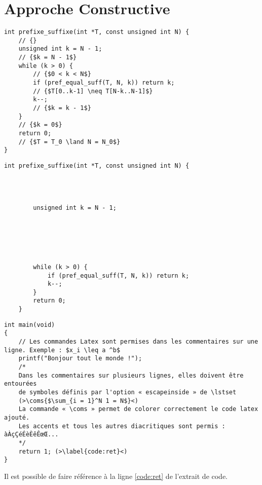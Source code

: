 \section{Approche Constructive}

\begin{lstlisting}[caption={SP1}]
int prefixe_suffixe(int *T, const unsigned int N) {
    // {}
    unsigned int k = N - 1;
    // {$k = N - 1$}
    while (k > 0) {
        // {$0 < k < N$}
        if (pref_equal_suff(T, N, k)) return k;
        // {$T[0..k-1] \neq T[N-k..N-1]$}
        k--;
        // {$k = k - 1$}
    }
    // {$k = 0$}
    return 0;
    // {$T = T_0 \land N = N_0$}
}
\end{lstlisting}




\begin{lstlisting}[caption={SP2}]
    int prefixe_suffixe(int *T, const unsigned int N) {




        unsigned int k = N - 1;






        while (k > 0) {
            if (pref_equal_suff(T, N, k)) return k;
            k--;
        }
        return 0;
    }
\end{lstlisting}


\begin{lstlisting}[caption={AAAA}]
int main(void)
{
    // Les commandes Latex sont permises dans les commentaires sur une ligne. Exemple : $x_i \leq a ^b$
    printf("Bonjour tout le monde !");
    /*
    Dans les commentaires sur plusieurs lignes, elles doivent être entourées
    de symboles définis par l'option « escapeinside » de \lstset
    (>\coms{$\sum_{i = 1}^N 1 = N$}<)
    La commande « \coms » permet de colorer correctement le code latex ajouté.
    Les accents et tous les autres diacritiques sont permis : àÀçÇéÉèÈêÊœŒ...
    */
    return 1; (>\label{code:ret}<)
}
\end{lstlisting}

Il est possible de faire référence à la ligne \ref{code:ret} de l'extrait de code.


